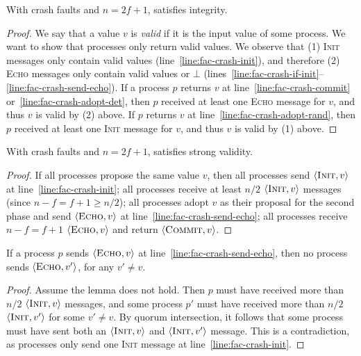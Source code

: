 \begin{lemma}
    With crash faults and $n=2f+1$,  satisfies integrity.
\end{lemma}
\begin{proof}
    We say that a value $v$ is \textit{valid} if it is the input value of some process. We want to show that processes only return valid values. We observe that (1) \textsc{Init} messages only contain valid values (line~\ref{line:fac-crash-init}), and therefore (2) \textsc{Echo} messages only contain valid values or $\bot$ (lines~\ref{line:fac-crash-if-init}--\ref{line:fac-crash-send-echo}). If a process $p$ returns $v$ at line~\ref{line:fac-crash-commit} or~\ref{line:fac-crash-adopt-det}, then $p$ received at least one \textsc{Echo} message for $v$, and thus $v$ is valid by (2) above. If $p$ returns $v$ at line~\ref{line:fac-crash-adopt-rand}, then $p$ received at least one \textsc{Init} message for $v$, and thus $v$ is valid by (1) above.
\end{proof}

\begin{lemma}
    With crash faults and $n=2f+1$,  satisfies strong validity.
\end{lemma}
\begin{proof}
    If all processes propose the same value $v$, then all processes send $\langle\textsc{Init}, v\rangle$ at line~\ref{line:fac-crash-init}; all processes receive at least $n/2$ $\langle\textsc{Init}, v\rangle$ messages (since $n-f = f+1 \geq n/2$); all processes adopt $v$ as their proposal for the second phase and send $\langle\textsc{Echo}, v\rangle$ at line~\ref{line:fac-crash-send-echo}; all processes receive $n-f=f+1$ $\langle\textsc{Echo}, v\rangle$ and return $\langle\textsc{Commit}, v\rangle$.
\end{proof}

\begin{lemma}\label{lem:fac-no-two-echo}
    If a process $p$ sends $\langle\textsc{Echo}, v\rangle$ at line~\ref{line:fac-crash-send-echo}, then no process sends $\langle\textsc{Echo}, v'\rangle$, for any $v'\ne v$.
\end{lemma}
\begin{proof}
    Assume the lemma does not hold. Then $p$ must have received more than $n/2$ $\langle\textsc{Init}, v\rangle$ messages, and some process $p'$ must have received more than $n/2$ $\langle\textsc{Init}, v'\rangle$ for some $v'\ne v$. By quorum intersection, it follows that some process must have sent both an $\langle\textsc{Init}, v\rangle$ and $\langle\textsc{Init}, v'\rangle$ message. This is a contradiction, as processes only send one \textsc{Init} message at line~\ref{line:fac-crash-init}.
\end{proof}

